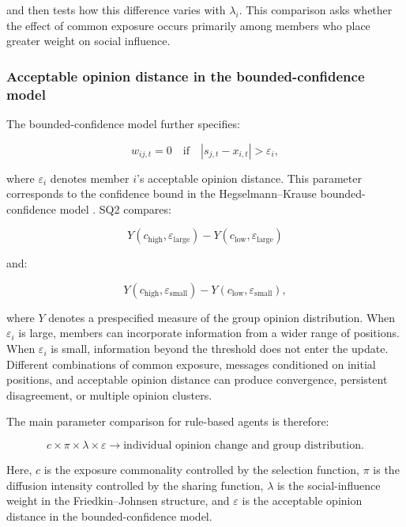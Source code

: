 \documentclass[11pt,a4paper]{article}
\begin{document}
and then tests how this difference varies with $\lambda_i$. This comparison asks whether the effect of common exposure occurs primarily among members who place greater weight on social influence.

\subsubsection{Acceptable opinion distance in the bounded-confidence model}

The bounded-confidence model further specifies:

\begin{equation*}
w_{ij,t}=0
\quad\text{if}\quad
|s_{j,t}-x_{i,t}|>\varepsilon_i,
\end{equation*}

where $\varepsilon_i$ denotes member $i$'s acceptable opinion distance. This parameter corresponds to the confidence bound in the Hegselmann--Krause bounded-confidence model \cite{hegselmann2002}. SQ2 compares:

\begin{equation*}
Y(c_{\text{high}},\varepsilon_{\text{large}})
-
Y(c_{\text{low}},\varepsilon_{\text{large}})
\end{equation*}

and:

\begin{equation*}
Y(c_{\text{high}},\varepsilon_{\text{small}})
-
Y(c_{\text{low}},\varepsilon_{\text{small}}),
\end{equation*}

where $Y$ denotes a prespecified measure of the group opinion distribution. When $\varepsilon_i$ is large, members can incorporate information from a wider range of positions. When $\varepsilon_i$ is small, information beyond the threshold does not enter the update. Different combinations of common exposure, messages conditioned on initial positions, and acceptable opinion distance can produce convergence, persistent disagreement, or multiple opinion clusters.

The main parameter comparison for rule-based agents is therefore:

\begin{equation*}
\boxed{
c
\times
\pi
\times
\lambda
\times
\varepsilon
\rightarrow
\text{individual opinion change and group distribution}
}.
\end{equation*}

Here, $c$ is the exposure commonality controlled by the selection function, $\pi$ is the diffusion intensity controlled by the sharing function, $\lambda$ is the social-influence weight in the Friedkin--Johnsen structure, and $\varepsilon$ is the acceptable opinion distance in the bounded-confidence model.
\end{document}
